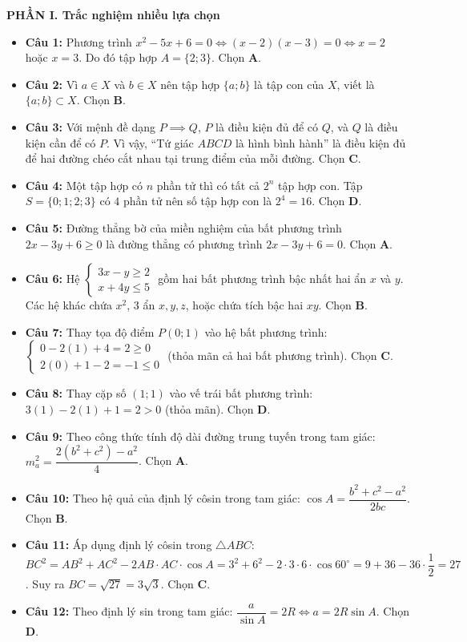 \documentclass[12pt,a4paper]{article}
\newcommand{\parttitle}[1]{\par\vspace{1.5pt}{\large\bfseries\color{ink}#1}\par\vspace{1.0pt}}
\begin{document}
\newpage
\parttitle{HƯỚNG DẪN GIẢI CHI TIẾT}

\textbf{PHẦN I. Trắc nghiệm nhiều lựa chọn}
\begin{itemize}[leftmargin=0.6cm, itemsep=2.5pt]
    \item \textbf{Câu 1:} Phương trình $x^2 - 5x + 6 = 0 \iff (x - 2)(x - 3) = 0 \iff x = 2$ hoặc $x = 3$. Do đó tập hợp $A = \{2; 3\}$. Chọn \textbf{A}.
    \item \textbf{Câu 2:} Vì $a \in X$ và $b \in X$ nên tập hợp $\{a; b\}$ là tập con của $X$, viết là $\{a; b\} \subset X$. Chọn \textbf{B}.
    \item \textbf{Câu 3:} Với mệnh đề dạng $P \implies Q$, $P$ là điều kiện đủ để có $Q$, và $Q$ là điều kiện cần để có $P$. Vì vậy, ``Tứ giác $ABCD$ là hình bình hành'' là điều kiện đủ để hai đường chéo cắt nhau tại trung điểm của mỗi đường. Chọn \textbf{C}.
    \item \textbf{Câu 4:} Một tập hợp có $n$ phần tử thì có tất cả $2^n$ tập hợp con. Tập $S = \{0; 1; 2; 3\}$ có $4$ phần tử nên số tập hợp con là $2^4 = 16$. Chọn \textbf{D}.
    \item \textbf{Câu 5:} Đường thẳng bờ của miền nghiệm của bất phương trình $2x - 3y + 6 \ge 0$ là đường thẳng có phương trình $2x - 3y + 6 = 0$. Chọn \textbf{A}.
    \item \textbf{Câu 6:} Hệ $\begin{cases} 3x - y \ge 2 \\ x + 4y \le 5 \end{cases}$ gồm hai bất phương trình bậc nhất hai ẩn $x$ và $y$. Các hệ khác chứa $x^2$, 3 ẩn $x, y, z$, hoặc chứa tích bậc hai $xy$. Chọn \textbf{B}.
    \item \textbf{Câu 7:} Thay tọa độ điểm $P(0; 1)$ vào hệ bất phương trình:
    $\begin{cases} 0 - 2(1) + 4 = 2 \ge 0 \\ 2(0) + 1 - 2 = -1 \le 0 \end{cases}$ (thỏa mãn cả hai bất phương trình). Chọn \textbf{C}.
    \item \textbf{Câu 8:} Thay cặp số $(1; 1)$ vào vế trái bất phương trình: $3(1) - 2(1) + 1 = 2 > 0$ (thỏa mãn). Chọn \textbf{D}.
    \item \textbf{Câu 9:} Theo công thức tính độ dài đường trung tuyến trong tam giác: $m_a^2 = \dfrac{2(b^2 + c^2) - a^2}{4}$. Chọn \textbf{A}.
    \item \textbf{Câu 10:} Theo hệ quả của định lý côsin trong tam giác: $\cos A = \dfrac{b^2 + c^2 - a^2}{2bc}$. Chọn \textbf{B}.
    \item \textbf{Câu 11:} Áp dụng định lý côsin trong $\triangle ABC$:
    $BC^2 = AB^2 + AC^2 - 2 AB \cdot AC \cdot \cos A = 3^2 + 6^2 - 2 \cdot 3 \cdot 6 \cdot \cos 60^\circ = 9 + 36 - 36 \cdot \dfrac{1}{2} = 27$.
    Suy ra $BC = \sqrt{27} = 3\sqrt{3}$. Chọn \textbf{C}.
    \item \textbf{Câu 12:} Theo định lý sin trong tam giác: $\dfrac{a}{\sin A} = 2R \iff a = 2R \sin A$. Chọn \textbf{D}.
\end{itemize}
\end{document}
